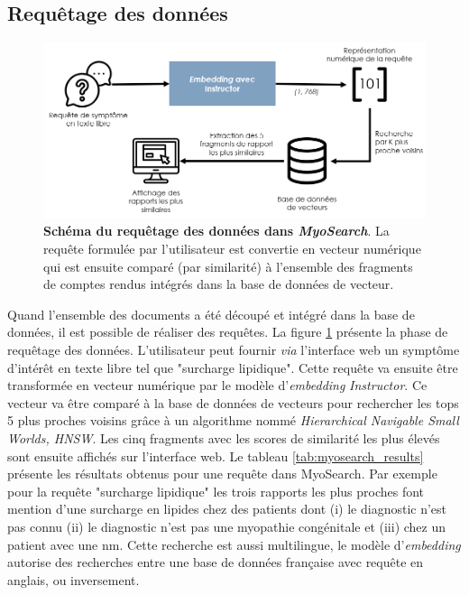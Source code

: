 \subsection{Requêtage des données}
\begin{figure}[!ht]
 \centering
 \includegraphics[width=1\textwidth]{figures/myosearch_query.png}
 \caption[Requêtage des données dans \textit{MyoSearch}]{\textbf{Schéma du requêtage des données dans \textit{MyoSearch}}. La requête formulée par l'utilisateur est convertie en vecteur numérique qui est ensuite comparé (par similarité) à l'ensemble des fragments de comptes rendus intégrés dans la base de données de vecteur.}
 \label{fig:myosearch_query}
\end{figure}
Quand l'ensemble des documents a été découpé et intégré dans la base de données, il est possible de réaliser des requêtes. La figure \ref{fig:myosearch_query} présente la phase de requêtage des données. L'utilisateur peut fournir \textit{via} l'interface web un symptôme d'intérêt en texte libre tel que "surcharge lipidique". Cette requête va ensuite être transformée en vecteur numérique par le modèle d'\textit{embedding }\textit{Instructor}. Ce vecteur va être comparé à la base de données de vecteurs pour rechercher les tops 5 plus proches voisins grâce à un algorithme nommé \textit{Hierarchical Navigable Small Worlds, HNSW}. Les cinq fragments avec les scores de similarité les plus élevés sont ensuite affichés sur l'interface web. Le tableau \ref{tab:myosearch_results} présente les résultats obtenus pour une requête dans MyoSearch. Par exemple pour la requête "surcharge lipidique" les trois rapports les plus proches font mention d'une surcharge en lipides chez des patients dont (i) le diagnostic n'est pas connu (ii) le diagnostic n'est pas une myopathie congénitale et (iii) chez un patient avec une \gls{nm}. Cette recherche est aussi multilingue, le modèle d'\textit{embedding} autorise des recherches entre une base de données française avec requête en anglais, ou inversement.
